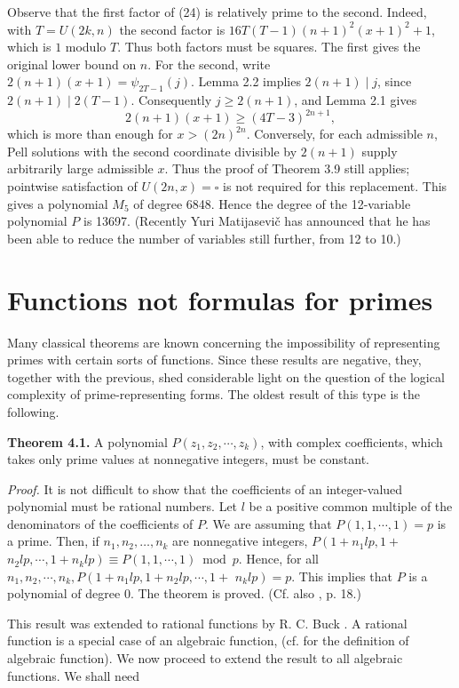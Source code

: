 \documentclass[10pt,letterpaper]{article}
\newcommand{\statement}[1]{\par\medskip\noindent\textbf{#1}\enspace}
\begin{document}
Observe that the first factor of (24) is relatively prime to the second.
Indeed, with $T=U(2k,n)$ the second factor is
$16T(T-1)(n+1)^2(x+1)^2+1$, which is $1$ modulo $T$.
Thus both factors must be squares. The first gives the original lower bound on $n$.
For the second, write
$2(n+1)(x+1)=\psi_{2T-1}(j)$.
Lemma 2.2 implies $2(n+1)\mid j$, since $2(n+1)\mid2(T-1)$.
Consequently $j\geq2(n+1)$, and Lemma 2.1 gives
\[
2(n+1)(x+1)\geq(4T-3)^{2n+1},
\]
which is more than enough for $x>(2n)^{2n}$.
Conversely, for each admissible $n$, Pell solutions with the second coordinate divisible
by $2(n+1)$ supply arbitrarily large admissible $x$.
Thus the proof of Theorem 3.9 still applies; pointwise satisfaction of $U(2n,x)=\square$
is not required for this replacement. This gives a polynomial $M_{5}$ of degree 6848. Hence the degree of the 12-variable polynomial $P$ is 13697. (Recently Yuri Matijasevič has announced that he has been able to reduce the number of variables still further, from 12 to 10.)

\section{Functions not formulas for primes} Many classical theorems are known concerning the impossibility of representing primes with certain sorts of functions. Since these results are negative, they, together with the previous, shed considerable light on the question of the logical complexity of prime-representing forms. The oldest result of this type is the following.

\statement{Theorem 4.1.} A polynomial $P\left(z_{1}, z_{2}, \cdots, z_{k}\right)$, with complex coefficients, which takes only prime values at nonnegative integers, must be constant.

\textit{Proof.} It is not difficult to show that the coefficients of an integer-valued polynomial must be rational numbers. Let $l$ be a positive common multiple of the denominators of the coefficients of $P$. We are assuming that $P(1,1, \cdots, 1)=p$ is a prime. Then, if $n_{1},n_{2},\ldots,n_{k}$ are nonnegative integers, $P\left(1+n_{1} l p, 1+\right.$ $\left.n_{2} l p, \cdots, 1+n_{k} l p\right) \equiv P(1,1, \cdots, 1) \bmod p$. Hence, for all $n_{1}, n_{2}, \cdots, n_{k}, P\left(1+n_{1} l p, 1+n_{2} l p, \cdots, 1+\right.$ $\left.n_{k} l p\right)=p$. This implies that $P$ is a polynomial of degree 0. The theorem is proved. (Cf. also \cite{ref6}, p. 18.)

This result was extended to rational functions by R. C. Buck \cite{ref2}. A rational function is a special case of an algebraic function, (cf. \cite{ref1} for the definition of algebraic function). We now proceed to extend the result to all algebraic functions. We shall need
\end{document}
